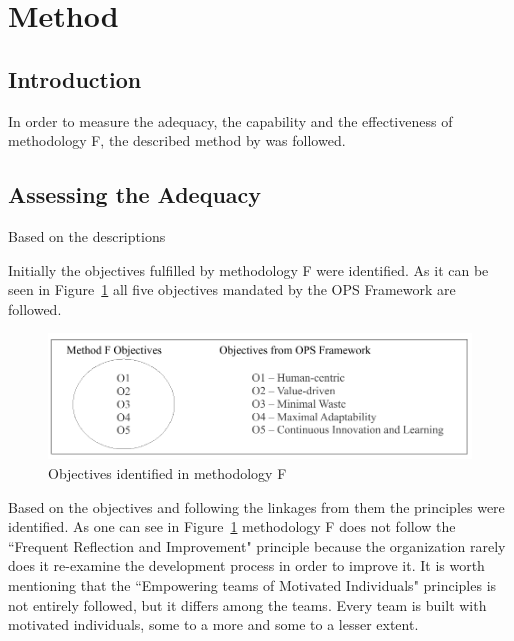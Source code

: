 

\section{Method}

\subsection{Introduction}
In order to measure the adequacy, the capability and the effectiveness of methodology F, the described method by \citet{sventha_dissertation} was followed.

\subsection{Assessing the Adequacy}

Based on the descriptions

Initially the objectives fulfilled by methodology F were identified. As it can be seen in Figure~\ref{fig:companyF_objectives} all five objectives mandated by the OPS Framework are followed.

\begin{figure}[H]
\centerline{\includegraphics[scale=0.9]{include/case_study/fig/companyF_objectives.pdf}}
\caption{Objectives identified in methodology F} 
\label{fig:companyF_objectives}
\end{figure}

Based on the objectives and following the linkages from them the principles were identified. As one can see in Figure~\ref{fig:companyF_objectives} methodology F does not follow the ``Frequent Reflection and Improvement" principle because the organization rarely does it re-examine the development process in order to improve it. %
It is worth mentioning that the ``Empowering teams of Motivated Individuals" principles is not entirely followed, but it differs among the teams. Every team is built with motivated individuals, some to a more and some to a lesser extent. 

